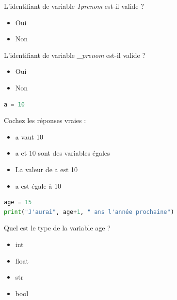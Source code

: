 
\begin{Quizz}
    L'identifiant de variable \textit{1prenom} est-il valide ?
    \begin{itemize}
    \renewcommand{\labelitemi}{$\square$}
    \item Oui
    \item Non
    \end{itemize}
\end{Quizz}

\begin{Quizz}
    L'identifiant de variable \textit{\_prenom} est-il valide ?
    \begin{itemize}
    \renewcommand{\labelitemi}{$\square$}
    \item Oui
    \item Non
    \end{itemize}
\end{Quizz}


\begin{Quizz}
     \begin{lstlisting}[language=Python]
a = 10     \end{lstlisting}
    Cochez les réponses vraies :
    \begin{itemize}
    \renewcommand{\labelitemi}{$\square$}
    \item a vaut 10
    \item a et 10 sont des variables égales
    \item La valeur de a est 10
    \item a est égale à 10
    \end{itemize}
\end{Quizz}


\begin{Quizz}
    \begin{lstlisting}[language=Python]
age = 15 
print("J'aurai", age+1, " ans l'année prochaine")\end{lstlisting}
    Quel est le type de la variable age ?
    \begin{itemize}
    \renewcommand{\labelitemi}{$\square$}
    \item int
    \item float
    \item str
    \item bool
    \end{itemize}
\end{Quizz}



